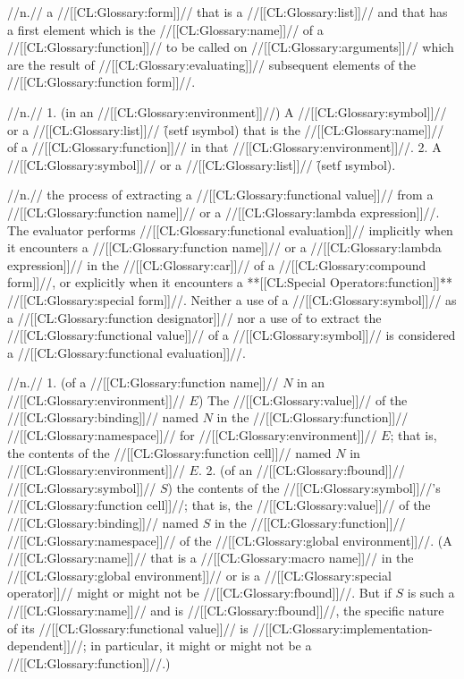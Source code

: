  //n.// a //[[CL:Glossary:form]]// that is a //[[CL:Glossary:list]]// and that has a first element which is the //[[CL:Glossary:name]]// of a //[[CL:Glossary:function]]// to be called on //[[CL:Glossary:arguments]]// which are the result of //[[CL:Glossary:evaluating]]// subsequent elements of the //[[CL:Glossary:function form]]//.
 
 //n.// 1. (in an //[[CL:Glossary:environment]]//) A //[[CL:Glossary:symbol]]// or a //[[CL:Glossary:list]]// \f{(setf \i{symbol})} that is the //[[CL:Glossary:name]]// of a //[[CL:Glossary:function]]// in that //[[CL:Glossary:environment]]//. 2. A //[[CL:Glossary:symbol]]// or a //[[CL:Glossary:list]]// \f{(setf \i{symbol})}.

 //n.// the process of extracting a //[[CL:Glossary:functional value]]// from a //[[CL:Glossary:function name]]// or a //[[CL:Glossary:lambda expression]]//. The evaluator performs //[[CL:Glossary:functional evaluation]]// implicitly when it encounters a //[[CL:Glossary:function name]]// or a //[[CL:Glossary:lambda expression]]// in the //[[CL:Glossary:car]]// of a //[[CL:Glossary:compound form]]//, or explicitly when it encounters a **[[CL:Special Operators:function]]** //[[CL:Glossary:special form]]//. Neither a use of a //[[CL:Glossary:symbol]]// as a //[[CL:Glossary:function designator]]// nor a use of  to extract the //[[CL:Glossary:functional value]]// of a //[[CL:Glossary:symbol]]// is considered a //[[CL:Glossary:functional evaluation]]//.

 //n.// 1. (of a //[[CL:Glossary:function name]]// $N$ in an //[[CL:Glossary:environment]]// $E$) The //[[CL:Glossary:value]]// of the //[[CL:Glossary:binding]]// named $N$ in the //[[CL:Glossary:function]]// //[[CL:Glossary:namespace]]// for //[[CL:Glossary:environment]]// $E$; that is, the contents of the //[[CL:Glossary:function cell]]// named $N$ in //[[CL:Glossary:environment]]// $E$. 2. (of an //[[CL:Glossary:fbound]]// //[[CL:Glossary:symbol]]// $S$) the contents of the //[[CL:Glossary:symbol]]//'s //[[CL:Glossary:function cell]]//; that is, the //[[CL:Glossary:value]]// of the //[[CL:Glossary:binding]]// named $S$ in the //[[CL:Glossary:function]]// //[[CL:Glossary:namespace]]// of the //[[CL:Glossary:global environment]]//. (A //[[CL:Glossary:name]]// that is a //[[CL:Glossary:macro name]]// in the //[[CL:Glossary:global environment]]// or is a //[[CL:Glossary:special operator]]// might or might not be //[[CL:Glossary:fbound]]//. But if $S$ is such a //[[CL:Glossary:name]]// and is //[[CL:Glossary:fbound]]//, the specific nature of its //[[CL:Glossary:functional value]]// is //[[CL:Glossary:implementation-dependent]]//; in particular, it might or might not be a //[[CL:Glossary:function]]//.)

